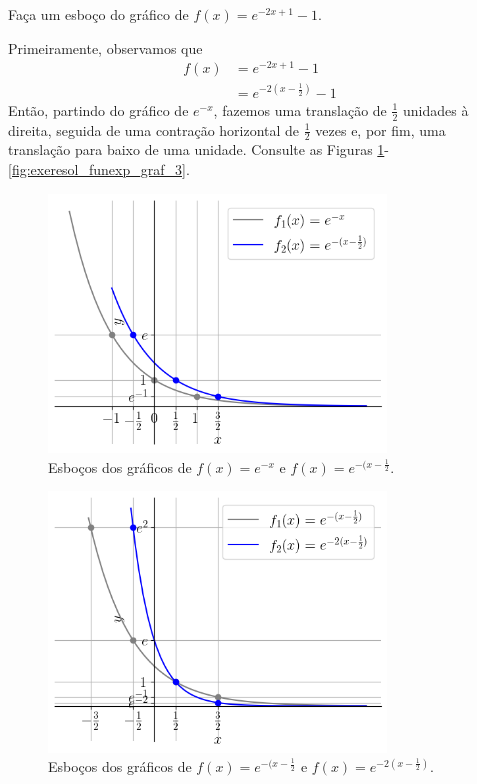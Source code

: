 \begin{exeresol}
  Faça um esboço do gráfico de $f(x) = e^{-2x+1}-1$.
\end{exeresol}
\begin{resol}
  Primeiramente, observamos que
  \begin{align}
    f(x) &= e^{-2x+1}-1\\
         &= e^{-2\left(x-\frac{1}{2}\right)}-1
  \end{align}
  Então, partindo do gráfico de $e^{-x}$, fazemos uma translação de $\frac{1}{2}$ unidades à direita, seguida de uma contração horizontal de $\frac{1}{2}$ vezes e, por fim, uma translação para baixo de uma unidade. Consulte as Figuras \ref{fig:exeresol_funexp_graf_1}-\ref{fig:exeresol_funexp_graf_3}.

  \begin{figure}[H]
    \centering
    \includegraphics[width=0.8\textwidth]{./cap_funcao/dados/fig_exeresol_funexp_graf/fig1}
    \caption{Esboços dos gráficos de $f(x) = e^{-x}$ e $f(x) = e^{-(x-\frac{1}{2}}$.}
    \label{fig:exeresol_funexp_graf_1}
  \end{figure}

    \begin{figure}[H]
    \centering
    \includegraphics[width=0.8\textwidth]{./cap_funcao/dados/fig_exeresol_funexp_graf/fig2}
    \caption{Esboços dos gráficos de $f(x) = e^{-(x-\frac{1}{2}}$ e $f(x) = e^{-2(x-\frac{1}{2})}$.}
    \label{fig:exeresol_funexp_graf_2}
  \end{figure}


\end{resol}
